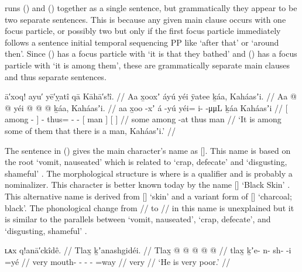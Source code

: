 \citeauthor{swanton:1909} runs (\lastx) and (\nextx) together as a single sentence, but grammatically they appear to be two separate sentences.
This is because any given main clause occurs with one focus particle, or possibly two but only if the first focus particle immediately follows a sentence initial temporal sequencing PP like  ‘after that’ or  ‘around then’.
Since (\lastx) has a focus particle with  ‘it is that they bathed’ and (\nextx) has a focus particle with  ‘it is among them’, these are grammatically separate main clauses and thus separate sentences.

\ex\label{ex:93-2-among-them}%
%
\begingl
	\glpreamble	ā′xoq! ayu′ yē′ỵatî qā Kāhā′s!î. //
	\glpreamble	Aa x̱ooxʼ áyú yéi ÿatee ḵáa, Kaháasʼi. //
	\gla	{} Aa  @ {} {}  @ {}
		yéi @  @ {} @ {}
		{} ḵáa, {} 
		{} Kaháasʼi. {} //
	\glb	{} aa x̱oo -xʼ {} á -yú
		yéi= i-  -μμL
		{} ḵáa {} 
		{} Kaháasʼi {} //
	\glc	{}[  among - {}]  -
		thus= -  -
		{}[ man {}]
		{}[  {}] //
	\gld	{} some among -at {}  {}
		thus  {} {}
		{} man {}
		{}  {} //
	\glft	‘It is among some of them that there is a man, Kaháasʼi.’
		//
\endgl
\xe

The sentence in (\lastx) gives the main character’s name as  [].
This name is based on the root  ‘vomit, nauseated’ which is related to  ‘crap, defecate’ and  ‘disgusting, shameful’ \parencites[01/88, 90–92, 97–98]{leer:1973}[2]{leer:1978b}.
The morphological structure is  where  is a qualifier and  is probably a nominalizer.
This character is better known today by the name  [] ‘Black Skin’ \parencites[890–892]{de-laguna:1972}[136–151]{dauenhauer:1987}[439–440]{mcclellan-cruikshank:2007b}[684–687]{mcclellan-cruikshank:2007c}.
This alternative name is derived from  [] ‘skin’ and a variant form of  [] ‘charcoal; black’.
The phonological change from  // to  // in this name is unexplained but it is similar to the parallels between  ‘vomit, nauseated’,  ‘crap, defecate’, and  ‘disgusting, shameful’ \parencites{leer:1990a}{crippen:2010}.

\ex\label{ex:93-3-very-poor}%
%
\begingl
	\glpreamble	ʟᴀx q!anā′ckîdê. //
	\glpreamble	Tlax̱ ḵʼanashgidéi. //
	\gla	Tlax̱  @ {} @ {} @ {} @ {} @ {} //
	\glb	tlax̱ ḵʼe- n- sh-  -i =yé //
	\glc	very mouth- - -  - =way //
	\gld	very  {} {} {} {} {} //
	\glft	‘He is very poor.’
		//
\endgl
\xe

